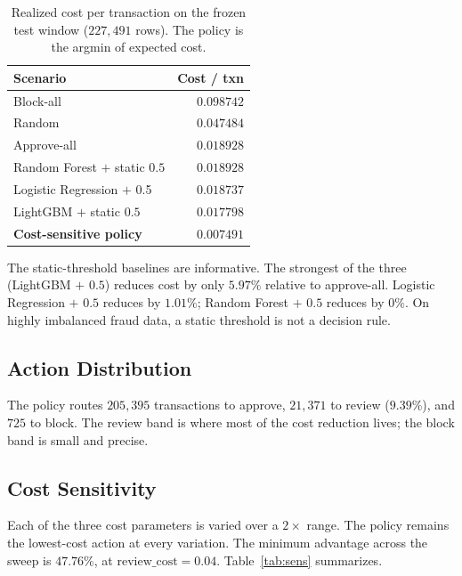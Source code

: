 \documentclass[conference]{IEEEtran}
\begin{document}
\begin{table}[!t]
\caption{Realized cost per transaction on the frozen test window
($227{,}491$ rows). The policy is the argmin of expected cost.}
\label{tab:backtest}
\centering
\small
\begin{tabular}{lr}
\toprule
Scenario & Cost / txn \\
\midrule
Block-all                     & $0.098742$ \\
Random                        & $0.047484$ \\
Approve-all                   & $0.018928$ \\
Random Forest $+$ static $0.5$& $0.018928$ \\
Logistic Regression $+$ 0.5   & $0.018737$ \\
LightGBM $+$ static $0.5$     & $0.017798$ \\
\midrule
\textbf{Cost-sensitive policy} & $\mathbf{0.007491}$ \\
\bottomrule
\end{tabular}
\end{table}

The static-threshold baselines are informative. The strongest of the three
(LightGBM $+$ $0.5$) reduces cost by only $5.97\%$ relative to approve-all.
Logistic Regression $+$ $0.5$ reduces by $1.01\%$; Random Forest $+$ $0.5$
reduces by $0\%$. On highly imbalanced fraud data, a static threshold is
not a decision rule.

\subsection{Action Distribution}

The policy routes $205{,}395$ transactions to approve, $21{,}371$ to review
($9.39\%$), and $725$ to block. The review band is where most of the cost
reduction lives; the block band is small and precise.

\subsection{Cost Sensitivity}

Each of the three cost parameters is varied over a $2\times$ range.
The policy remains the lowest-cost action at every variation. The minimum
advantage across the sweep is $47.76\%$, at $\text{review\_cost} = 0.04$.
Table~\ref{tab:sens} summarizes.
\end{document}
